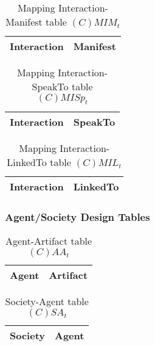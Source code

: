 \begin{table}[H]
	\centering
	\begin{tabular}{|p{4cm}|p{8cm}|}
			\hline
			\textbf{Interaction} & \textbf{Manifest} \\
			\hline
			\hline
		\end{tabular}
	\caption{Mapping Interaction-Manifest table $(C)MIM_t$}
	\label{tab:cmimt}
\end{table}

\begin{table}[H]
	\centering
	\begin{tabular}{|p{4cm}|p{8cm}|}
			\hline
			\textbf{Interaction} & \textbf{SpeakTo} \\
			\hline
			\hline
		\end{tabular}
	\caption{Mapping Interaction-SpeakTo table $(C)MISp_t$}
	\label{tab:cmispt}
\end{table}

\begin{table}[H]
	\centering
	\begin{tabular}{|p{4cm}|p{8cm}|}
			\hline
			\textbf{Interaction} & \textbf{LinkedTo} \\
			\hline
			\hline
		\end{tabular}
	\caption{Mapping Interaction-LinkedTo table $(C)MIL_t$}
	\label{tab:cmilt}
\end{table}

\subsubsection{Agent/Society Design Tables}

\begin{table}[H]
	\centering
	\begin{tabular}{|p{4cm}|p{8cm}|}
			\hline
			\textbf{Agent} & \textbf{Artifact} \\
			\hline
			\hline
		\end{tabular}
	\caption{Agent-Artifact table $(C)AA_t$}
	\label{tab:caat}
\end{table}

\begin{table}[H]
	\centering
	\begin{tabular}{|p{4cm}|p{8cm}|}
			\hline
			\textbf{Society} & \textbf{Agent} \\
			\hline
			\hline
		\end{tabular}
	\caption{Society-Agent table $(C)SA_t$}
	\label{tab:csat}
\end{table}

